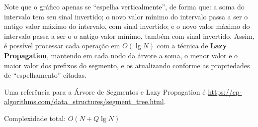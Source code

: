 Note que o gráfico apenas se ``espelha verticalmente'', de forma que: a soma do intervalo tem seu sinal invertido; o novo valor mínimo do
intervalo passa a ser o antigo valor máximo do intervalo, com sinal invertido; e
o novo valor máximo do intervalo passa a ser o o antigo valor mínimo, também com
sinal invertido. Assim, é possível processar cada operação em $O(\lg N)$ com a técnica de
\textbf{Lazy Propagation}, mantendo em
cada nodo da árvore a soma, o menor valor e o maior valor dos prefixos do
segmento, e os atualizando conforme as propriedades de ``espelhamento'' citadas.

Uma referência para a Árvore de Segmentos e Lazy Propagation é
\url{https://cp-algorithms.com/data_structures/segment_tree.html}.

Complexidade total: $O(N + Q\lg N)$
